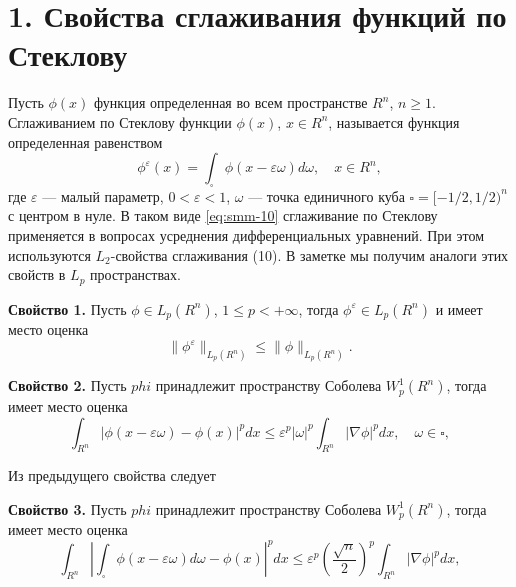 \section*{1. Свойства сглаживания функций по Стеклову}
Пусть $\phi(x)$ функция определенная во всем пространстве  $R^n$, $n\geqslant1$. Сглаживанием по Стеклову функции $\phi(x)$, $x\in R^n$, называется функция определенная равенством
\begin{equation}\label{eq:smm-10}
\phi^\varepsilon (x)=\int_\square \phi(x-\varepsilon \omega)d\omega, \quad   x\in R^n, 
\end{equation}                
где  $\varepsilon$ --- малый параметр,  $0<\varepsilon<1$, $\omega$ --- точка единичного куба $\square=[-1/2,1/2)^n$ с центром в нуле.
В таком виде \eqref{eq:smm-10} сглаживание по Стеклову применяется в вопросах усреднения дифференциальных уравнений. При этом используются $L_2$-свойства сглаживания (10). В заметке мы получим аналоги этих свойств в  $L_p$ пространствах.

\textbf{Свойство 1.} Пусть  $\phi\in L_p (R^n)$, $1\leqslant p<+\infty$, тогда 
$\phi^\varepsilon\in L_p (R^n)$ и имеет место оценка
$$
\|\phi^\varepsilon\|_{L_p (R^n )} \leqslant\|\phi\|_{L_p (R^n)}.    
$$

\textbf{Свойство 2.} Пусть $phi$ принадлежит пространству Соболева $W_p^1 (R^n)$, тогда имеет место оценка
$$
\int_{R^n}|\phi(x-\varepsilon\omega)-\phi(x)|^p  dx \leqslant \varepsilon^p |\omega|^p  \int_{R^n}|\nabla \phi|^p dx,   \quad \omega\in\square,        
$$


Из предыдущего свойства следует

\textbf{Свойство 3.} Пусть $phi$ принадлежит пространству Соболева $W_p^1 (R^n)$, тогда имеет место оценка
$$
\int_{R^n}\left|\int_\square\phi(x-\varepsilon\omega)d\omega-\phi(x)\right|^p  dx \leqslant \varepsilon^p \left(\frac{\sqrt{n}}{2}\right)^p  \int_{R^n}|\nabla \phi|^p dx,         
$$



